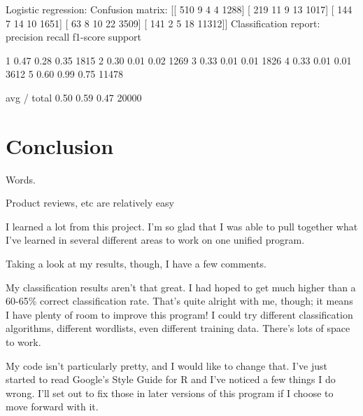 \documentclass[12pt]{report}
\begin{document}
Logistic regression:
Confusion matrix:
[[  510     9     4     4  1288]
[  219    11     9    13  1017]
[  144     7    14    10  1651]
[   63     8    10    22  3509]
[  141     2     5    18 11312]]
Classification report:
precision    recall  f1-score   support

1       0.47      0.28      0.35      1815
2       0.30      0.01      0.02      1269
3       0.33      0.01      0.01      1826
4       0.33      0.01      0.01      3612
5       0.60      0.99      0.75     11478

avg / total       0.50      0.59      0.47     20000

\newpage

\chapter*{Conclusion}

Words.

Product reviews, etc are relatively easy

I learned a lot from this project. I’m so glad that I was able to pull together what I’ve learned in several different areas to work on one unified program.

Taking a look at my results, though, I have a few comments.

My classification results aren’t that great. I had hoped to get much higher than a 60-65\% correct classification rate. That’s quite alright with me, though; it means I have plenty of room to improve this program! I could try different classification algorithms, different wordlists, even different training data. There’s lots of space to work.

My code isn’t particularly pretty, and I would like to change that. I’ve just started to read Google’s Style Guide for R and I’ve noticed a few things I do wrong. I’ll set out to fix those in later versions of this program if I choose to move forward with it.

\newpage

\end{document}
